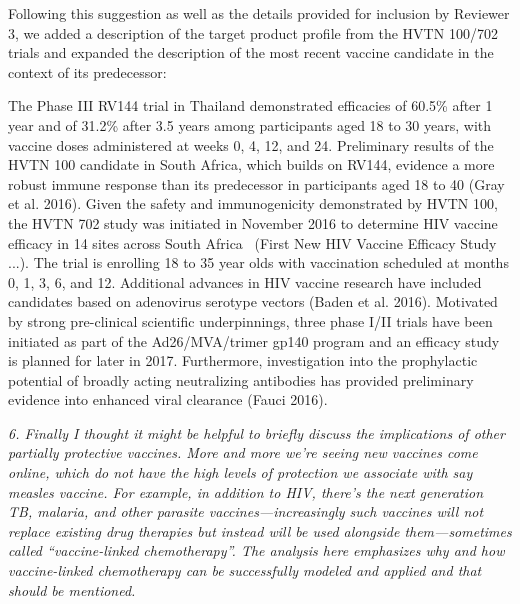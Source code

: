 \documentclass[12pt]{jpmletter}
\newenvironment{original}{\it}{}
\begin{document}
\begin{letter}{}
    Following this suggestion as well as the details provided for
    inclusion by Reviewer 3, we added a description of the target
    product profile from the HVTN 100/702 trials and expanded the
    description of the most recent vaccine candidate in the context of
    its predecessor:
    \begin{quoting}
      The Phase III RV144 trial in Thailand demonstrated efficacies of
      60.5\% after 1 year and of 31.2\% after 3.5 years among
      participants aged 18 to 30 years, with vaccine doses
      administered at weeks 0, 4, 12, and 24. Preliminary results of
      the HVTN 100 candidate in South Africa, which builds on RV144,
      evidence a more robust immune response than its predecessor in
      participants aged 18 to 40 (Gray et al. 2016). Given the safety
      and immunogenicity demonstrated by HVTN 100, the HVTN 702 study
      was initiated in November 2016 to determine HIV vaccine efficacy
      in 14 sites across South Africa  (First New HIV Vaccine Efficacy
      Study ...). The trial is enrolling 18 to 35 year olds with
      vaccination scheduled at months 0, 1, 3, 6, and 12. Additional
      advances in HIV vaccine research have included candidates based
      on adenovirus serotype vectors (Baden et al. 2016). Motivated by
      strong pre-clinical scientific underpinnings, three phase I/II
      trials have been initiated as part of the Ad26/MVA/trimer gp140
      program and an efficacy study is planned for later in
      2017. Furthermore, investigation into the prophylactic potential
      of broadly acting neutralizing antibodies has provided
      preliminary evidence into enhanced viral clearance (Fauci 2016).
    \end{quoting}
    
    \begin{original}
      6. Finally I thought it might be helpful to briefly discuss the
      implications of other partially protective vaccines. More and
      more we're seeing new vaccines come online, which do not have
      the high levels of protection we associate with say measles
      vaccine. For example, in addition to HIV, there's the next
      generation TB, malaria, and other parasite vaccines—increasingly
      such vaccines will not replace existing drug therapies but
      instead will be used alongside them—sometimes called
      ``vaccine-linked chemotherapy''. The analysis here emphasizes
      why and how vaccine-linked chemotherapy can be successfully
      modeled and applied and that should be mentioned.
    \end{original}
    

\end{letter}
\end{document}
